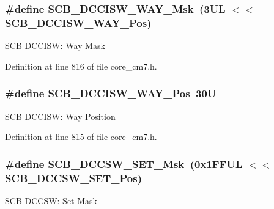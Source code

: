 \subsubsection[{\texorpdfstring{S\+C\+B\+\_\+\+D\+C\+C\+I\+S\+W\+\_\+\+W\+A\+Y\+\_\+\+Msk}{SCB_DCCISW_WAY_Msk}}]{\setlength{\rightskip}{0pt plus 5cm}\#define S\+C\+B\+\_\+\+D\+C\+C\+I\+S\+W\+\_\+\+W\+A\+Y\+\_\+\+Msk~(3\+U\+L $<$$<$ S\+C\+B\+\_\+\+D\+C\+C\+I\+S\+W\+\_\+\+W\+A\+Y\+\_\+\+Pos)}\hypertarget{group___c_m_s_i_s___s_c_b_gaf2269bbe0bc7705e1da8f5ee0f581054}{}\label{group___c_m_s_i_s___s_c_b_gaf2269bbe0bc7705e1da8f5ee0f581054}
S\+CB D\+C\+C\+I\+SW\+: Way Mask 

Definition at line 816 of file core\+\_\+cm7.\+h.

\subsubsection[{\texorpdfstring{S\+C\+B\+\_\+\+D\+C\+C\+I\+S\+W\+\_\+\+W\+A\+Y\+\_\+\+Pos}{SCB_DCCISW_WAY_Pos}}]{\setlength{\rightskip}{0pt plus 5cm}\#define S\+C\+B\+\_\+\+D\+C\+C\+I\+S\+W\+\_\+\+W\+A\+Y\+\_\+\+Pos~30U}\hypertarget{group___c_m_s_i_s___s_c_b_gaa90bd0b36679219d6a2144eba6eb96cd}{}\label{group___c_m_s_i_s___s_c_b_gaa90bd0b36679219d6a2144eba6eb96cd}
S\+CB D\+C\+C\+I\+SW\+: Way Position 

Definition at line 815 of file core\+\_\+cm7.\+h.

\subsubsection[{\texorpdfstring{S\+C\+B\+\_\+\+D\+C\+C\+S\+W\+\_\+\+S\+E\+T\+\_\+\+Msk}{SCB_DCCSW_SET_Msk}}]{\setlength{\rightskip}{0pt plus 5cm}\#define S\+C\+B\+\_\+\+D\+C\+C\+S\+W\+\_\+\+S\+E\+T\+\_\+\+Msk~(0x1\+F\+F\+U\+L $<$$<$ S\+C\+B\+\_\+\+D\+C\+C\+S\+W\+\_\+\+S\+E\+T\+\_\+\+Pos)}\hypertarget{group___c_m_s_i_s___s_c_b_ga669e16d98c8ea0e66afb04641971d98c}{}\label{group___c_m_s_i_s___s_c_b_ga669e16d98c8ea0e66afb04641971d98c}
S\+CB D\+C\+C\+SW\+: Set Mask 


